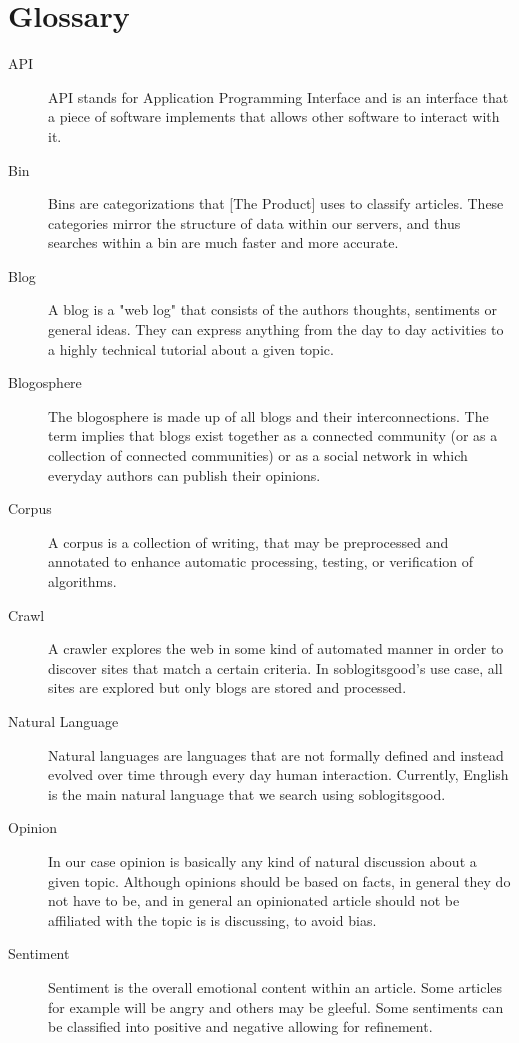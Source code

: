 \documentclass[titlepage]{article}
\begin{document}
\section{Glossary}
\begin{description}
\item[API]
API stands for Application Programming Interface and is an interface that a
piece of software implements that allows other software to interact with it.
\item[Bin]
Bins are categorizations that [The Product] uses to classify articles. These
categories mirror the structure of data within our servers, and thus searches
within a bin are much faster and more accurate.
\item[Blog]
A blog is a "web log" that consists of the authors thoughts, sentiments or
general ideas. They can express anything from the day to day activities to a
highly technical tutorial about a given topic.
\item[Blogosphere]
The blogosphere is made up of all blogs and their interconnections. The term
implies that blogs exist together as a connected community (or as a collection
of connected communities) or as a social network in which everyday authors can
publish their opinions.
\item[Corpus]
A corpus is a collection of writing, that may be preprocessed and annotated to
enhance automatic processing, testing, or verification of algorithms.
\item[Crawl]
A crawler explores the web in some kind of automated manner in order to discover
sites that match a certain criteria. In \textsf{soblogitsgood}'s use case, all sites are
explored but only blogs are stored and processed.
\item[Natural Language]
Natural languages are languages that are not formally defined and instead
evolved over time through every day human interaction. Currently, English is
the main natural language that we search using \textsf{soblogitsgood}.
\item[Opinion]
In our case opinion is basically any kind of natural discussion about a given
topic. Although opinions should be based on facts, in general they do not have
to be, and in general an opinionated article should not be affiliated with the
topic is is discussing, to avoid bias.
\item[Sentiment]
Sentiment is the overall emotional content within an article. Some articles
for example will be angry and others may be gleeful. Some sentiments can be 
classified into positive and negative allowing for refinement.
\end{description}
\end{document}
